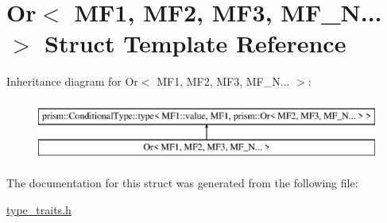 \hypertarget{struct_or_3_01_m_f1_00_01_m_f2_00_01_m_f3_00_01_m_f___n_8_8_8_01_4}{}\section{Or$<$ M\+F1, M\+F2, M\+F3, M\+F\+\_\+N... $>$ Struct Template Reference}
\label{struct_or_3_01_m_f1_00_01_m_f2_00_01_m_f3_00_01_m_f___n_8_8_8_01_4}
Inheritance diagram for Or$<$ M\+F1, M\+F2, M\+F3, M\+F\+\_\+N... $>$\+:\begin{figure}[H]
\begin{center}
\leavevmode
\includegraphics[height=2.000000cm]{struct_or_3_01_m_f1_00_01_m_f2_00_01_m_f3_00_01_m_f___n_8_8_8_01_4}
\end{center}
\end{figure}


The documentation for this struct was generated from the following file\+:\begin{DoxyCompactItemize}
\item 
\hyperlink{type__traits_8h}{type\+\_\+traits.\+h}\end{DoxyCompactItemize}
